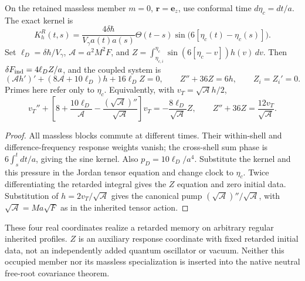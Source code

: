 \documentclass[12pt,a4paper]{article}
\begin{document}
\begin{corollary}
\label{p8:cor:massless-tt-memory-realization}
On the retained massless member $m=0$, $\mathbf r=\mathbf e_z$, use
conformal time $d\eta_c=dt/a$. The exact kernel is
\[
 K_h^R(t,s)=\frac{4\delta\hbar}{V_\gamma a(t)a(s)}\Theta(t-s)
             \sin\bigl(6[\eta_c(t)-\eta_c(s)]\bigr).
\]
Set $\ell_D=\delta\hbar/V_\gamma$, $\mathcal A=a^2M^2F$, and
$Z=\int_{\eta_{c,i}}^{\eta_c}\sin(6[\eta_c-v])h(v)\,dv$.
Then $\delta F_{\rm ind}=4\ell_D Z/a$, and the coupled system is
\[
 (\mathcal A h')'+(8\mathcal A+10\ell_D)h+16\ell_DZ=0,
 \qquad Z''+36Z=6h,\qquad Z_i=Z_i'=0.
\]
Primes here refer only to $\eta_c$. Equivalently, with
$v_T=\sqrt{\mathcal A}h/2$,
\[
 v_T''+\left[8+\frac{10\ell_D}{\mathcal A}
             -\frac{(\sqrt{\mathcal A})''}{\sqrt{\mathcal A}}\right]v_T
       =-\frac{8\ell_D}{\sqrt{\mathcal A}}Z,\qquad
 Z''+36Z=\frac{12v_T}{\sqrt{\mathcal A}}.
\]
\end{corollary}
\begin{proof}
All massless blocks commute at different times. Their within-shell and
difference-frequency response weights vanish; the cross-shell sum phase
is $6\int_s^tdt/a$, giving the sine kernel.
Also $p_D=10\ell_D/a^4$. Substitute the kernel and this pressure in
the Jordan tensor equation and change clock to $\eta_c$.
Twice differentiating the retarded integral gives the $Z$ equation and
zero initial data. Substitution of $h=2v_T/\sqrt{\mathcal A}$ gives the
canonical pump $(\sqrt{\mathcal A})''/\sqrt{\mathcal A}$, with
$\sqrt{\mathcal A}=Ma\sqrt F$ as in the inherited tensor action.
\end{proof}
These four real coordinates realize a retarded memory on arbitrary
regular inherited profiles. $Z$ is an auxiliary response coordinate with
fixed retarded initial data, not an independently added quantum oscillator
or vacuum. Neither this occupied member nor its massless specialization
is inserted into the native neutral free-root covariance theorem.




\end{document}
